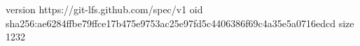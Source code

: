 version https://git-lfs.github.com/spec/v1
oid sha256:ae6284ffbe79ffce17b475e9753ac25e97fd5c4406386f69c4a35e5a0716edcd
size 1232
